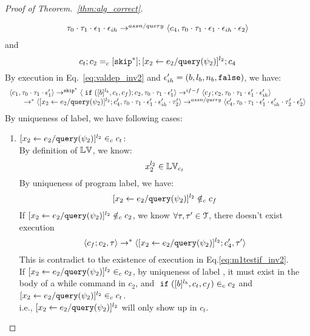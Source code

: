 \begin{proof}[Proof of Theorem.~\ref{thm:alg_correct}]
\begin{case}
\begin{subcase}
\begin{subsubcase}
\begin{subsubsubcase}
\begin{subproof}
\[\begin{array}{l}
{  \ensuremath{\mathtt{\tau}}_0 \cdot \ensuremath{\mathtt{\tau}}_1 \cdot \ensuremath{\mathtt{\epsilon}}_1 \cdot \ensuremath{\mathtt{\epsilon}}_{ih}} 
  \rightarrow^{assn/query} 
  \langle {c}_4,  \mathtt{\tau}_0 \cdot \mathtt{\tau}_1 \cdot \mathtt{\epsilon}_1 \cdot \mathtt{\epsilon}_{ih} \cdot \mathtt{\epsilon}_2 \rangle 
  \end{array}
\]
and 
\[
  c_t;c_2 =_c [\mathtt{skip}^*]; [\mathrel{ {x}_2 \leftarrow e_2 / {\tt query}(\psi_2) }]^{l_2};{c}_4
\]
%
By execution in Eq.~\ref{eq:valdep_inv2} and $\mathtt{\epsilon}_{ih}' = (b, l_b, n_b, \mathtt{false})$, we have:
\begin{equation}
\label{eq:m1testif_inv2}
  \begin{array}{l}   
  \langle c_1, \mathtt{\tau}_0 \cdot \mathtt{\tau}_1 \cdot \mathtt{\epsilon}_1' \rangle 
  \rightarrow^{\mathtt{skip}^*} 
  \langle \;\mathtt{if}\; ([b]^{l_b}, c_t, c_f); {c}_2, \mathtt{\tau}_0 \cdot \mathtt{\tau}_1 \cdot \mathtt{\epsilon}_1' \rangle 
  \rightarrow^{if-f} 
  \langle c_f;c_2, \mathtt{\tau}_0 \cdot \mathtt{\tau}_1 \cdot \mathtt{\epsilon}_1' \cdot \mathtt{\epsilon}_{ih}' \rangle 
  \\
  \qquad \rightarrow^{*} 
  \langle [\mathrel{ {x}_2 \leftarrow e_2 / {\tt query}(\psi_2) }]^{l_2};{c}_4', 
  \mathtt{\tau}_0 \cdot \mathtt{\tau}_1 \cdot \mathtt{\epsilon}_1' \cdot \mathtt{\epsilon}_{ih}' \cdot \mathtt{\tau}_2' \rangle
  \rightarrow^{assn/query} 
  \langle {c}_4',  \mathtt{\tau}_0 \cdot \mathtt{\tau}_1 \cdot \mathtt{\epsilon}_1' \cdot \mathtt{\epsilon}_{ih}' \cdot \mathtt{\tau}_2' \cdot \mathtt{\epsilon}_2' \rangle 
\end{array}
\end{equation}
%
 By uniqueness of label, we have following cases:
 \begin{enumerate}
 \item $[\mathrel{ {x}_2 \leftarrow e_2 / {\tt query}(\psi_2) }]^{l_2} \in_c c_t$:
\\
By definition of $\mathbb{LV}$, we know:
\[
  x_2^{l_2} \in \mathbb{LV}_{c_t}
\]
%
 By uniqueness of program label, we have:
 \[
 [\mathrel{ {x}_2 \leftarrow e_2 / {\tt query}(\psi_2) }]^{l_2} \notin_c c_f
 \]
 If $[\mathrel{ {x}_2 \leftarrow e_2 / {\tt query}(\psi_2) }]^{l_2} \notin_c c_2$,
we know $\forall \mathtt{\tau}, \mathtt{\tau}' \in \mathcal{T}$, there doesn't exist execution
 \[
  \langle c_f;c_2, \mathtt{\tau} \rangle \rightarrow^{*} 
  \langle [\mathrel{ {x}_2 \leftarrow e_2 / {\tt query}(\psi_2) }]^{l_2};{c}_4', \mathtt{\tau}' \rangle
 \]
 This is contradict to the existence of execution in Eq.\ref{eq:m1testif_inv2}.
 \\
 If $[\mathrel{ {x}_2 \leftarrow e_2 / {\tt query}(\psi_2) }]^{l_2} \in_c c_2$, 
 by uniqueness of label , 
 it must exist in the body of a while command in $c_2$,
 and $\;\mathtt{if}\; ([b]^{l_b}, c_t, c_f) \in_c c_2$ and $[\mathrel{ {x}_2 \leftarrow e_2 / {\tt query}(\psi_2) }]^{l_2} \in_c c_t$. 
\\
%
i.e., $[\mathrel{ {x}_2 \leftarrow e_2 / {\tt query}(\psi_2) }]^{l_2}$ will only show up in $c_t$.

\end{enumerate}
\end{subproof}
\end{subsubsubcase}
\end{subsubcase}
\end{subcase}
\end{case}
\end{proof}
